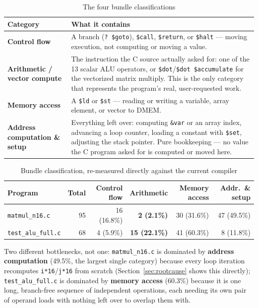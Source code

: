 \documentclass[11pt,a4paper]{article}
\begin{document}
\begin{table}[h]
\centering
\caption{The four bundle classifications}
\begin{tabular}{@{}p{2.6cm}p{9.4cm}@{}}
\toprule
Category & What it contains \\
\midrule
\textbf{Control flow} & A branch (\texttt{?~\$goto}), \texttt{\$call}, \texttt{\$return},
  or \texttt{\$halt} --- moving execution, not computing or moving a value. \\
\textbf{Arithmetic / vector compute} & The instruction the C source actually asked for:
  one of the 13 scalar ALU operators, or \texttt{\$dot}/\texttt{\$dot \$accumulate} for
  the vectorized matrix multiply. This is the only category that represents the
  program's real, user-requested work. \\
\textbf{Memory access} & A \texttt{\$ld} or \texttt{\$st} --- reading or writing a
  variable, array element, or vector to DMEM. \\
\textbf{Address computation \& setup} & Everything left over: computing \texttt{\&var}
  or an array index, advancing a loop counter, loading a constant with \texttt{\$set},
  adjusting the stack pointer. Pure bookkeeping --- no value the C program asked for is
  computed or moved here. \\
\bottomrule
\end{tabular}
\end{table}

\begin{table}[h]
\centering
\caption{Bundle classification, re-measured directly against the current compiler}
\label{tab:efficiency}
\begin{tabular}{@{}p{3.4cm}rrrrr@{}}
\toprule
Program & Total & Control flow & Arithmetic & Memory access & Addr.\ \& setup \\
\midrule
\texttt{matmul\_n16.c} & 95 & 16 (16.8\%) & \textbf{2 (2.1\%)} & 30 (31.6\%) & 47 (49.5\%) \\
\texttt{test\_alu\_full.c} & 68 & 4 (5.9\%) & \textbf{15 (22.1\%)} & 41 (60.3\%) & 8 (11.8\%) \\
\bottomrule
\end{tabular}
\end{table}

Two different bottlenecks, not one: \texttt{matmul\_n16.c} is dominated by
\textbf{address computation} (49.5\%, the largest single category) because every loop
iteration recomputes \texttt{i*16}/\texttt{j*16} from scratch (Section~\ref{sec:rootcause}
shows this directly); \texttt{test\_alu\_full.c} is dominated by \textbf{memory access}
(60.3\%) because it is one long, branch-free sequence of independent operations, each
needing its own pair of operand loads with nothing left over to overlap them with.
\end{document}
